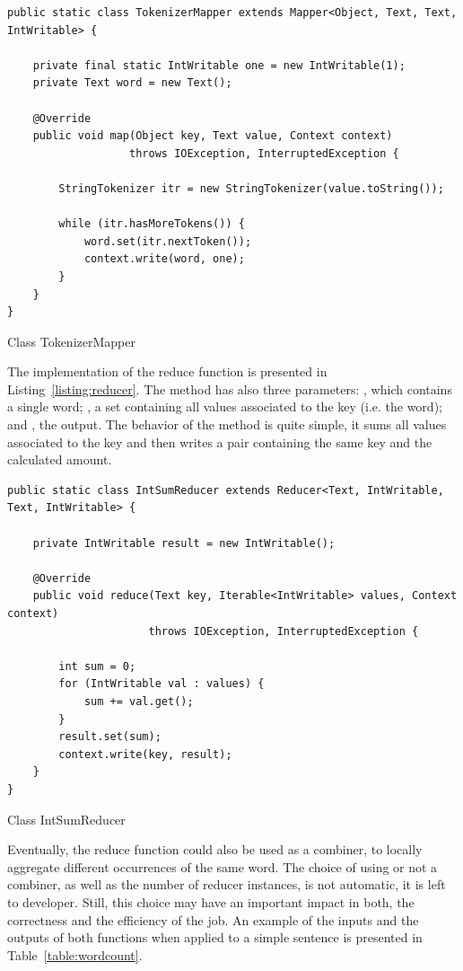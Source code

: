\singlespacing
\begin{listing}[H]
\begin{verbatim}
public static class TokenizerMapper extends Mapper<Object, Text, Text, IntWritable> {
   
    private final static IntWritable one = new IntWritable(1);
    private Text word = new Text();
   
    @Override
    public void map(Object key, Text value, Context context) 
                   throws IOException, InterruptedException {

        StringTokenizer itr = new StringTokenizer(value.toString());
      
        while (itr.hasMoreTokens()) {
            word.set(itr.nextToken());
            context.write(word, one);
        }
    }
}
\end{verbatim}
\caption{Class TokenizerMapper} 
\label{listing:mapper}
\end{listing}

\doublespacing
The implementation of the reduce function is presented in Listing~\ref{listing:reducer}.
The  method has also three parameters: , which contains a single word; , a set containing all values associated to the key (i.e. the word); and , the output.
The behavior of the method is quite simple, it sums all values associated to the key and then writes a pair containing the same key and the calculated amount.
\singlespacing
\begin{listing}[H]
\begin{verbatim}
public static class IntSumReducer extends Reducer<Text, IntWritable, Text, IntWritable> {

    private IntWritable result = new IntWritable();

    @Override
    public void reduce(Text key, Iterable<IntWritable> values, Context context)
                      throws IOException, InterruptedException {
	
        int sum = 0;
        for (IntWritable val : values) {
            sum += val.get();
        }
        result.set(sum);
        context.write(key, result);
    }
}
\end{verbatim}
\caption{Class IntSumReducer} 
\label{listing:reducer}
\end{listing}

\doublespacing
Eventually, the reduce function could also be used as a combiner, to locally aggregate different occurrences of the same word.
The choice of using or not a combiner, as well as the number of reducer instances, is not automatic, it is left to developer.
Still, this choice may have an important impact in both, the correctness and the efficiency of the job.
An example of the inputs and the outputs of both functions when applied to a simple sentence is presented in Table~\ref{table:wordcount}.


